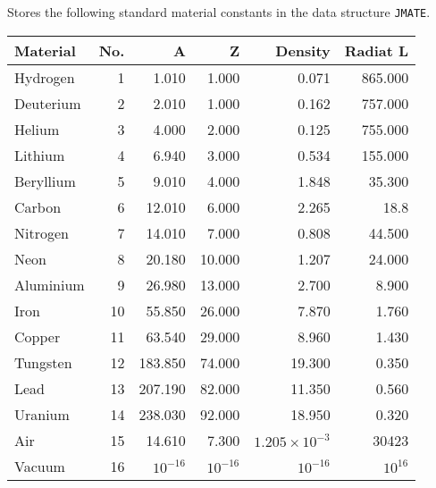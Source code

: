              
 
Stores the following standard material constants
in the data structure \cite{bib-PDGD}
{\tt JMATE}.
\begin{center}\begin{tabular}{|l|r|r|r|r|r|}
 \hline
Material   &No. &A         &Z       &Density   &Radiat L   \\
\hline
Hydrogen   &1   &1.010     &1.000   &0.071     &865.000    \\
Deuterium  &2   &2.010     &1.000   &0.162     &757.000    \\
Helium     &3   &4.000     &2.000   &0.125     &755.000    \\
Lithium    &4   &6.940     &3.000   &0.534     &155.000    \\
Beryllium  &5   &9.010     &4.000   &1.848     &35.300     \\
Carbon     &6   &12.010    &6.000   &2.265     &18.8       \\
Nitrogen   &7   &14.010    &7.000   &0.808     &44.500     \\
Neon       &8   &20.180    &10.000  &1.207     &24.000     \\
Aluminium  &9   &26.980    &13.000  &2.700     &8.900      \\
Iron       &10  &55.850    &26.000  &7.870     &1.760      \\
Copper     &11  &63.540    &29.000  &8.960     &1.430      \\
Tungsten   &12  &183.850   &74.000  &19.300    &0.350      \\
Lead       &13  &207.190   &82.000  &11.350    &0.560      \\
Uranium    &14  &238.030   &92.000  &18.950    &0.320      \\
Air        &15  &14.610    &7.300   &$1.205 \times 10^{-3}$ &30423  \\
Vacuum     &16  &$10^{-16}$ &$10^{-16}$ &$10^{-16}$ &$10^{16}$ \\
\hline
\end{tabular} \end{center}
 
